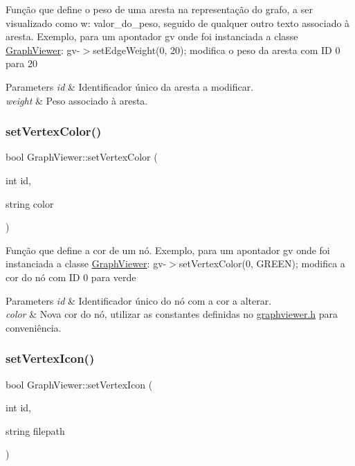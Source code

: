 Função que define o peso de uma aresta na representação do grafo, a ser visualizado como w\+: valor\+\_\+do\+\_\+peso, seguido de qualquer outro texto associado à aresta. Exemplo, para um apontador gv onde foi instanciada a classe \mbox{\hyperlink{class_graph_viewer}{Graph\+Viewer}}\+: gv-\/$>$set\+Edge\+Weight(0, 20); modifica o peso da aresta com ID 0 para 20


\begin{DoxyParams}{Parameters}
{\em id} & Identificador único da aresta a modificar. \\
\hline
{\em weight} & Peso associado à aresta. \\
\hline
\end{DoxyParams}
\mbox{\label{class_graph_viewer_a8b542d7e09e81a45a74760c19233beb0}} 
\subsubsection{\texorpdfstring{setVertexColor()}{setVertexColor()}}
{\footnotesize\ttfamily bool Graph\+Viewer\+::set\+Vertex\+Color (\begin{DoxyParamCaption}\item[{int}]{id,  }\item[{string}]{color }\end{DoxyParamCaption})}

Função que define a cor de um nó. Exemplo, para um apontador gv onde foi instanciada a classe \mbox{\hyperlink{class_graph_viewer}{Graph\+Viewer}}\+: gv-\/$>$set\+Vertex\+Color(0, G\+R\+E\+E\+N); modifica a cor do nó com ID 0 para verde


\begin{DoxyParams}{Parameters}
{\em id} & Identificador único do nó com a cor a alterar. \\
\hline
{\em color} & Nova cor do nó, utilizar as constantes definidas no \mbox{\hyperlink{graphviewer_8h_source}{graphviewer.\+h}} para conveniência. \\
\hline
\end{DoxyParams}
\mbox{\label{class_graph_viewer_a02d5f7393eab9a2d1b66719039597a64}} 
\subsubsection{\texorpdfstring{setVertexIcon()}{setVertexIcon()}}
{\footnotesize\ttfamily bool Graph\+Viewer\+::set\+Vertex\+Icon (\begin{DoxyParamCaption}\item[{int}]{id,  }\item[{string}]{filepath }\end{DoxyParamCaption})}

